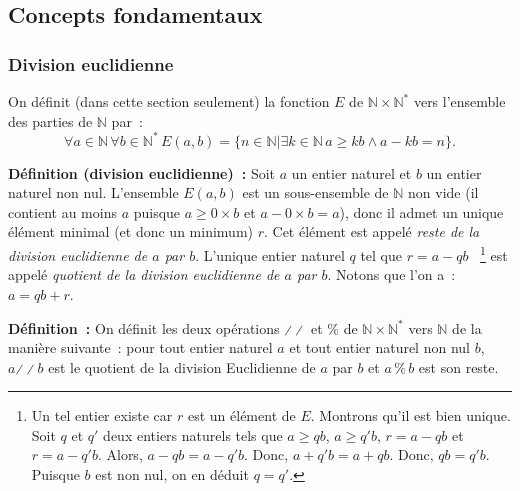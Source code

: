 \subsection{Concepts fondamentaux}

\subsubsection{Division euclidienne}
\label{subsec:divEuclidienne}

On définit (dans cette section seulement) la fonction $E$ de $\mathbb{N} \times \mathbb{N}^*$ vers l'ensemble des parties de $\mathbb{N}$ par : 
\begin{equation*}
    \forall a \in \mathbb{N} \, 
    \forall b \in \mathbb{N}^* \, 
    E(a,b) = \lbrace
        n \in \mathbb{N} 
        \vert
        \exists k \in \mathbb{N} \,  
        a \geq k b \wedge a - k b = n
    \rbrace .
\end{equation*}

\medskip

\noindent\textbf{Définition (division euclidienne) :}
Soit $a$ un entier naturel et $b$ un entier naturel non nul.
L'ensemble $E(a,b)$ est un sous-ensemble de $\mathbb{N}$ non vide (il contient au moins $a$ puisque $a \geq 0 \times b$ et $a - 0 \times b = a$), donc il admet un unique élément minimal (et donc un minimum) $r$. 
Cet élément est appelé \textit{reste de la division euclidienne de $a$ par $b$}. 
L'unique entier naturel $q$ tel que $r = a - q b$%
~\footnote{Un tel entier existe car $r$ est un élément de $E$. 
    Montrons qu'il est bien unique. 
    Soit $q$ et $q'$ deux entiers naturels tels que $a \geq q b$, $a \geq q' b$, $r = a - q b$ et $r = a - q' b$.
    Alors, $a - q b = a - q' b$.
    Donc, $a + q' b = a + q b$.
    Donc, $q b = q' b$.
    Puisque $b$ est non nul, on en déduit $q = q'$.
}  
est appelé \textit{quotient de la division euclidienne de $a$ par $b$}. 
Notons que l'on a : $a = q b + r$. 

\medskip

\noindent\textbf{Définition :} On définit les deux opérations $\divslash\!\divslash$ et $\%$ de $\mathbb{N} \times \mathbb{N}^*$ vers $\mathbb{N}$ de la manière suivante : pour tout entier naturel $a$ et tout entier naturel non nul $b$, $a \mathrel{\divslash\!\divslash} b$ est le quotient de la division Euclidienne de $a$ par $b$ et $a \mathrel{\%} b$ est son reste. 

\medskip

